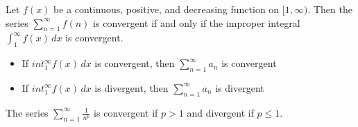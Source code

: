 \begin{theorem}
  Let \(f(x)\) be a continuous, positive, and decreasing function on \([1, \infty)\). Then the series \(\sum_{n = 1}^{\infty} f(n)\) is convergent if and only if the improper integral \(\int_{1}^{\infty} f(x) \, dx\) is convergent.
  \begin{itemize}
    \item If \(int_{1}^{\infty} f(x) \, dx\) is convergent, then \(\sum_{n=1}^{\infty} a_{n}\) is convergent
    \item If \(int_{1}^{\infty} f(x) \, dx\) is divergent, then \(\sum_{n=1}^{\infty} a_{n}\) is divergent
  \end{itemize}
\end{theorem}

\begin{lemma}[P-series]
  The series \(\sum_{n=1}^{\infty} \frac{1}{n^p}\) is convergent if \(p > 1\) and divergent if \(p \leq 1\).
\end{lemma}


